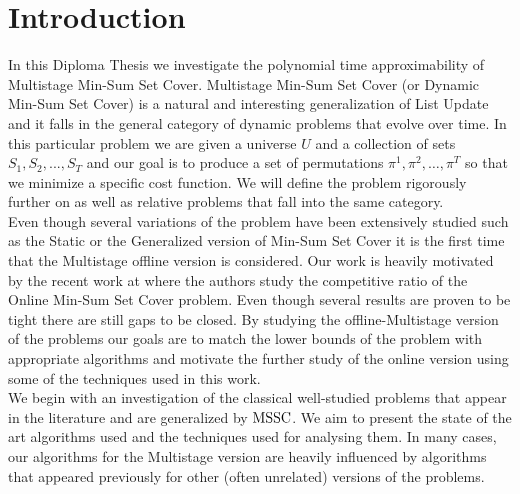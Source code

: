 \chapter{Introduction}

In this Diploma Thesis we investigate the polynomial time approximability of Multistage Min-Sum Set Cover. Multistage Min-Sum Set Cover (or Dynamic Min-Sum Set Cover) is a natural and interesting generalization of List Update and it falls in the general category of dynamic problems that evolve over time. In this particular problem we are given a universe $U$ and a collection of sets $S_1, S_2, ..., S_T$ and our goal is to produce a set of permutations $\pi^1, \pi^2, \ldots, \pi^T$ so that we minimize a specific cost function. We will define the problem rigorously further on as well as relative problems that fall into the same category. \\

Even though several variations of the problem have been extensively studied such as the Static \cite{FLT02} or the Generalized version \cite{AGY09,BGK10} of Min-Sum Set Cover it is the first time that the Multistage offline version is considered. Our work is heavily motivated by the recent work at \cite{FKKSV20} where the authors study the competitive ratio of the Online Min-Sum Set Cover problem. Even though several results are proven to be tight there are still gaps to be closed. By studying the offline-Multistage version of the problems our goals are to match the lower bounds of the problem with appropriate algorithms and motivate the further study of the online version using some of the techniques used in this work. \\

We begin with an investigation of the classical well-studied problems that appear in the literature and are generalized by $\mathrm{MSSC}$. We aim to present the state of the art algorithms used and the techniques used for analysing them. In many cases, our algorithms for the Multistage version are heavily influenced by algorithms that appeared previously for other (often unrelated) versions of the problems. \\

